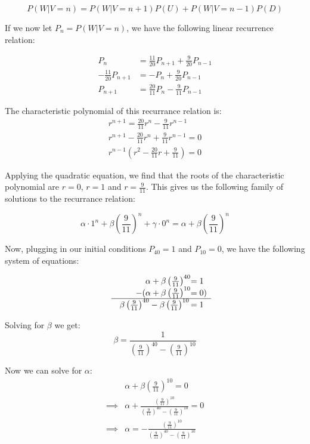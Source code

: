 \documentclass{article}
\begin{document}
\begin{equation*}
    P(W|V=n)=P(W|V=n+1)P(U)+P(W|V=n-1)P(D)
\end{equation*}

If we now let $P_n=P(W|V=n)$, we have the following linear recurrence relation:

\begin{align*}
    P_n&=\frac{11}{20}P_{n+1}+\frac{9}{20}P_{n-1}\\
    -\frac{11}{20}P_{n+1}&=-P_n+\frac{9}{20}P_{n-1}\\
    P_{n+1}&=\frac{20}{11}P_n-\frac{9}{11}P_{n-1}
\end{align*}

The characteristic polynomial of this recurrance relation is:
\begin{gather*}
    r^{n+1}=\frac{20}{11}r^n-\frac{9}{11}r^{n-1}\\
    r^{n+1}-\frac{20}{11}r^n+\frac{9}{11}r^{n-1}=0\\
    r^{n-1}\left(r^2-\frac{20}{11}r+\frac{9}{11}\right)=0
\end{gather*}

Applying the quadratic equation, we find that the roots of the characteristic polynomial are $r=0$, $r=1$ and $r=\frac{9}{11}$. This gives us the following family of solutions to the recurrance relation:

\begin{equation*}
    \alpha\cdot1^n+\beta\left(\frac{9}{11}\right)^n+\gamma\cdot0^n=\alpha+\beta\left(\frac{9}{11}\right)^n
\end{equation*}

Now, plugging in our initial conditions $P_{40}=1$ and $P_{10}=0$, we have the following system of equations:

\[
  \begin{array}{l@{\quad}cr@{}l}
    && \alpha+\beta\left(\frac{9}{11}\right)^{40}&=1 \\
    && -(\alpha+\beta\left(\frac{9}{11}\right)^{10}&=0) \\ \cline{2-4}
    && \beta\left(\frac{9}{11}\right)^{40}-\beta\left(\frac{9}{11}\right)^{10}{}&= 1
  \end{array}
\]

Solving for $\beta$ we get:
\begin{equation*}
    \beta=\frac{1}{\left(\frac{9}{11}\right)^{40}-\left(\frac{9}{11}\right)^{10}}
\end{equation*}

Now we can solve for $\alpha$:
\begin{align*}
    &\alpha+\beta\left(\frac{9}{11}\right)^{10}=0\\
    \implies&\alpha+\frac{\left(\frac{9}{11}\right)^{10}}{\left(\frac{9}{11}\right)^{40}-\left(\frac{9}{11}\right)^{10}}=0\\
    \implies&\alpha=-\frac{\left(\frac{9}{11}\right)^{10}}{\left(\frac{9}{11}\right)^{40}-\left(\frac{9}{11}\right)^{10}}\\
\end{align*}
\end{document}
